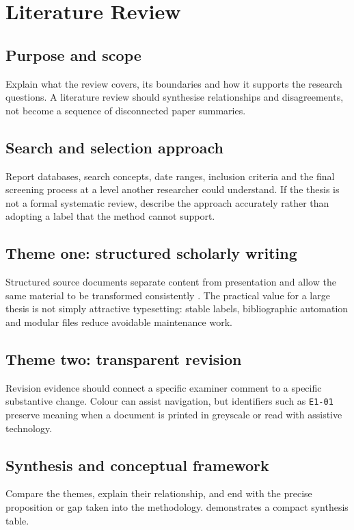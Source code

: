 \chapter{Literature Review}
\label{chap:literature}

\section{Purpose and scope}
Explain what the review covers, its boundaries and how it supports the research
questions. A literature review should synthesise relationships and disagreements,
not become a sequence of disconnected paper summaries.

\section{Search and selection approach}
Report databases, search concepts, date ranges, inclusion criteria and the final
screening process at a level another researcher could understand. If the thesis is not
a formal systematic review, describe the approach accurately rather than adopting a
label that the method cannot support.

\section{Theme one: structured scholarly writing}
Structured source documents separate content from presentation and allow the same
material to be transformed consistently \citep{lamport1994latex}. The practical
value for a large thesis is not simply attractive typesetting: stable labels,
bibliographic automation and modular files reduce avoidable maintenance work.

\section{Theme two: transparent revision}
Revision evidence should connect a specific examiner comment to a specific substantive
change. Colour can assist navigation, but identifiers such as \texttt{E1-01} preserve
meaning when a document is printed in greyscale or read with assistive technology.

\section{Synthesis and conceptual framework}
Compare the themes, explain their relationship, and end with the precise proposition
or gap taken into the methodology.  demonstrates a
compact synthesis table.


